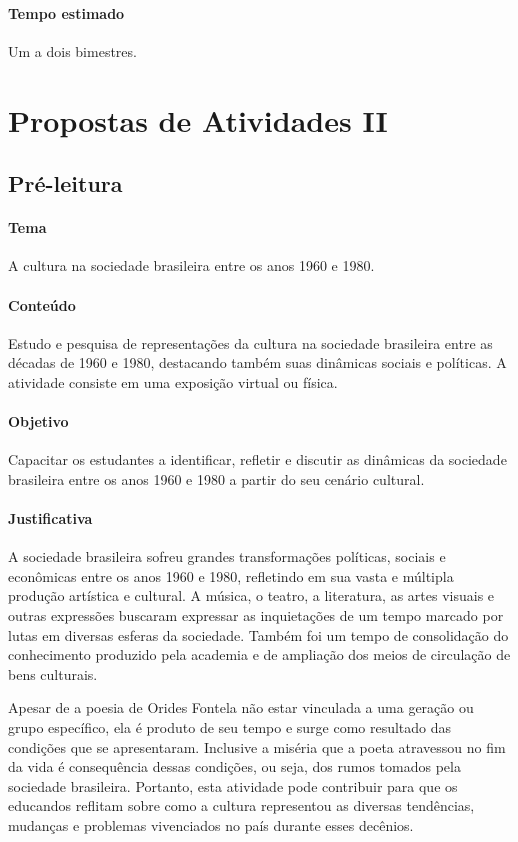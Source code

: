 \documentclass[12pt]{extarticle}
\begin{document}
\paragraph{Tempo estimado} Um a dois bimestres.


\section{Propostas de Atividades II}

\subsection{Pré-leitura}


\paragraph{Tema}{A cultura na sociedade brasileira entre os anos 1960 e 1980.}

\paragraph{Conteúdo} Estudo e pesquisa de representações da cultura na
sociedade brasileira entre as décadas de 1960 e 1980, destacando também
suas dinâmicas sociais e políticas. A atividade consiste em uma
exposição virtual ou física.

\paragraph{Objetivo} Capacitar os estudantes a identificar, refletir e
discutir as dinâmicas da sociedade brasileira entre os anos 1960 e 1980
a partir do seu cenário cultural.

\paragraph{Justificativa} A sociedade brasileira sofreu grandes
transformações políticas, sociais e econômicas entre os anos 1960 e
1980, refletindo em sua vasta e múltipla produção artística e cultural.
A música, o teatro, a literatura, as artes visuais e outras expressões
buscaram expressar as inquietações de um tempo marcado por lutas em
diversas esferas da sociedade. Também foi um tempo de consolidação do
conhecimento produzido pela academia e de ampliação dos meios de
circulação de bens culturais.

Apesar de a poesia de Orides Fontela não estar vinculada a uma geração
ou grupo específico, ela é produto de seu tempo e surge como resultado
das condições que se apresentaram. Inclusive a miséria que a poeta
atravessou no fim da vida é consequência dessas condições, ou seja, dos
rumos tomados pela sociedade brasileira. Portanto, esta atividade pode
contribuir para que os educandos reflitam sobre como a cultura
representou as diversas tendências, mudanças e problemas vivenciados no
país durante esses decênios.
\end{document}
